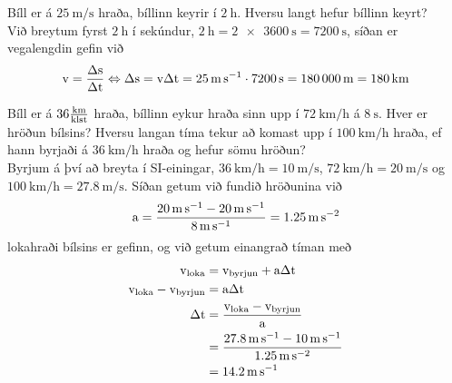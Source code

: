 %
\begin{formalexample}
Bíll er á $\SI{25}{\meter\per\second}$ hraða, bíllinn keyrir í 
$\SI{2}{\hour}$. Hversu langt
hefur bíllinn keyrt?
\\[4 ex]
Við breytum fyrst $\SI{2}{\hour}$ í sekúndur, $\SI{2}{\hour} = \SI{2 x 3600}{\second} 
= \SI{7200}{\second}$, síðan er vegalengdin gefin við
\[
	\textrm{v} = \frac{\Delta\textrm{s}}{\Delta\textrm{t}}
		\Leftrightarrow
		\Delta\textrm{s} = \textrm{v} \Delta\textrm{t}
			= \SI{25}{\meter\per\second} \cdot \SI{7200}{\second}
			= \SI{180000}{\meter}
			= \SI{180}{\kilo\meter}
\]
\end{formalexample}
%
\begin{formalexample}
Bíll er á $36 \frac{\text{km}}{\text{klst}}$ hraða, bíllinn eykur hraða sinn upp í 
$\SI{72}{\km\per\hour}$
á $\SI{8}{\second}$. 
Hver er hröðun bílsins? Hversu langan tíma tekur að komast upp í 
$\SI{100}{\km\per\hour}$
hraða, ef hann byrjaði á $\SI{36}{\km\per\hour}$ 
hraða og hefur sömu hröðun?
\\[4 ex]
Byrjum á því að breyta í SI-einingar, 
$\SI{36}{\km\per\hour} = \SI{10}{\meter\per\second}$,
$\SI{72}{\km\per\hour} = \SI{20}{\meter\per\second}$ 
og 
$\SI{100}{\km\per\hour} = \SI{27.8}{\meter\per\second}$. 
Síðan getum við fundið hröðunina við
\[
	\textrm{a} = \frac{
		\SI{20}{\meter\per\second} - \SI{20}{\meter\per\second}
		}{\SI{8}{\meter\per\second} }
		= \SI{1.25}{\meter\per\second\squared}
\]
lokahraði bílsins er gefinn, og við getum einangrað tíman með
\begin{align*}
	\uspeed_\text{loka} &= \uspeed_\text{byrjun} + \uaccelea \Delta\utime \\
	\uspeed_\text{loka} - \uspeed_\text{byrjun} &=  \uaccelea \Delta\utime \\
	\Delta\utime &= \frac{\uspeed_\text{loka} - \uspeed_\text{byrjun}}{\uaccelea}\\
		&= \frac{
			\SI{27.8}{\meter\per\second} - \SI{10}{\meter\per\second}
			}{
			\SI{1.25}{\meter\per\second\squared}
			} \\
		&= \SI{14.2}{\m\per\s}
\end{align*}
\end{formalexample}


